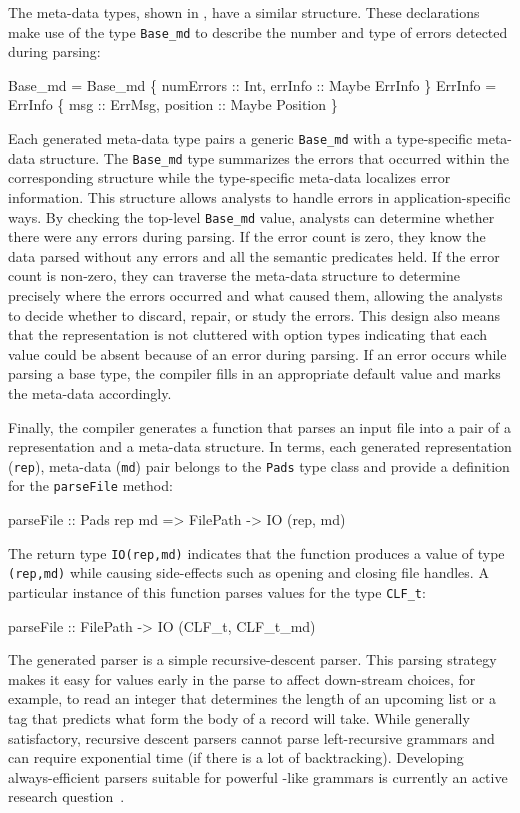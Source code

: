 \documentclass{sig-alternate}
\begin{document}
The meta-data types, shown in 
, have a similar structure.
These declarations make use of the type
\texttt{Base\_md} to describe the number and type of errors detected
during parsing: 
\begin{code}
 Base_md = Base_md 
        \{ numErrors :: Int,
          errInfo   :: Maybe ErrInfo \}
 ErrInfo = ErrInfo 
       \{ msg      :: ErrMsg,
         position :: Maybe Position \}
\end{code}



Each generated meta-data type pairs a generic \texttt{Base\_md} with a
type-specific meta-data structure.  The \texttt{Base\_md} type
summarizes the errors that occurred within the corresponding
structure while the type-specific meta-data localizes error
information.  This structure allows analysts to handle errors in
application-specific ways.  By checking the top-level
\texttt{Base\_md} value, analysts can determine whether there were
any errors during parsing. If the error count is zero, they know 
the data parsed without any errors and all the semantic predicates
held.  If the error count is non-zero, they can traverse the
meta-data structure to determine precisely where the errors occurred
and what caused them, allowing the analysts to decide whether to discard,
repair, or study the errors. This design also means that the
representation is not cluttered with option types indicating that each
value could be absent because of an error during parsing.  If an error
occurs while parsing a base type, the compiler fills in an appropriate
default value and marks the meta-data accordingly.


Finally, the compiler generates a function that parses
an input file into a pair of a representation and a meta-data
structure.  In \haskell{} terms, each generated representation (\texttt{rep}),
meta-data (\texttt{md}) pair belongs to the \texttt{Pads} type class and provide
a definition for the \texttt{parseFile} method:
\begin{code}
parseFile :: Pads rep md => 
             FilePath -> IO (rep, md)
\end{code}
The return type \texttt{IO(rep,md)} indicates that the function
produces a value of type \texttt{(rep,md)} while causing side-effects
such as opening and closing file handles.  A particular instance of
this function parses values for the type \texttt{CLF\_t}:
\begin{code}
parseFile :: FilePath -> IO (CLF_t, CLF_t_md)
\end{code}
The generated parser is a simple recursive-descent parser.  This
parsing strategy makes it easy for values early in the parse to affect
down-stream choices, for example, to read an integer that determines
the length of an upcoming list or a tag that predicts what form the
body of a record will take.  While generally satisfactory, recursive
descent parsers cannot parse left-recursive grammars and
can require exponential time (if there is a lot of
backtracking).  Developing always-efficient parsers suitable for
powerful \pads{}-like grammars is currently an active research question~\cite{Jim+:yakker}.
\end{document}
